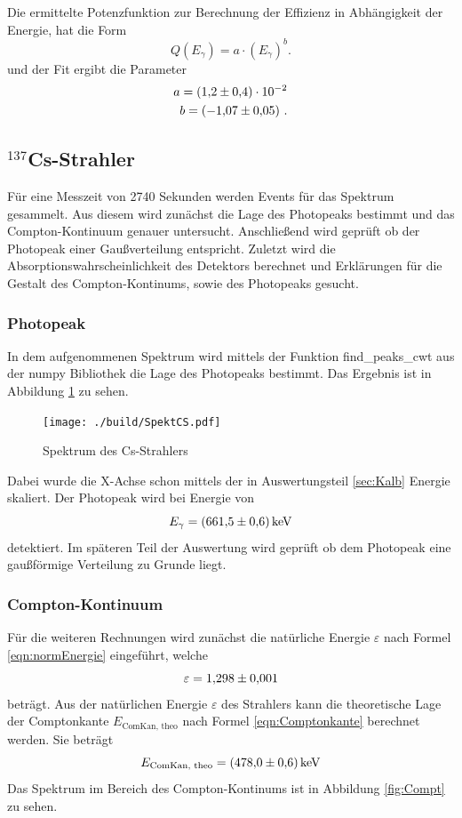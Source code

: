 Die ermittelte Potenzfunktion zur Berechnung der Effizienz in Abhängigkeit der Energie, hat die Form
\begin{equation}
  Q(E_\gamma)=  a \cdot \left( E_\gamma \right)^{b} .
  \label{eqn:QCs}
\end{equation}
und der Fit ergibt die Parameter
\begin{eqnarray}
  a = (\num{1,2 +- 0,4}) \cdot 10^{-2} \\
  b = (\num{-1,07 +- 0,05}) \ .
\end{eqnarray}

\subsection{$^{137}$Cs-Strahler}
Für eine Messzeit von 2740 Sekunden werden Events für das Spektrum gesammelt. Aus diesem wird zunächst die Lage des Photopeaks bestimmt und das Compton-Kontinuum genauer untersucht. Anschließend wird geprüft ob der Photopeak einer Gaußverteilung entspricht. Zuletzt wird die Absorptionswahrscheinlichkeit des Detektors berechnet und Erklärungen für die Gestalt des Compton-Kontinums, sowie des Photopeaks gesucht.


\subsubsection{Photopeak}
In dem aufgenommenen Spektrum wird mittels der Funktion find\_peaks\_cwt aus der numpy Bibliothek die Lage des Photopeaks bestimmt. Das Ergebnis ist in Abbildung \ref{fig:SpekCS} zu sehen.
\begin{figure}
  \centering
  \texttt{[image: ./build/SpektCS.pdf]}
  \caption{Spektrum des Cs-Strahlers}
  \label{fig:SpekCS}
\end{figure}

Dabei wurde die X-Achse schon mittels der in Auswertungsteil \ref{sec:Kalb} Energie skaliert. Der Photopeak wird bei Energie von
\begin{equation}
  E_\gamma = (\num{661,5 +- 0,6}) \, \text{keV}
  \label{eqn:CsPhoto}
\end{equation}
detektiert. Im späteren Teil der Auswertung wird geprüft ob dem Photopeak eine gaußförmige Verteilung zu Grunde liegt.


\subsubsection{Compton-Kontinuum}
Für die weiteren Rechnungen wird zunächst die natürliche Energie $\varepsilon$ nach Formel \ref{eqn:normEnergie} eingeführt, welche
\begin{equation}
\varepsilon = \num{1,298 +- 0,001}
  \label{eqn:nE}
\end{equation}
beträgt. Aus der natürlichen Energie $\varepsilon$ des Strahlers kann die theoretische Lage der Comptonkante $E_\text{ComKan, theo}$ nach Formel \ref{eqn:Comptonkante} berechnet werden. Sie beträgt
\begin{equation}
  E_\text{ComKan, theo} = (\num{478,0 +- 0,6}) \, \text{keV}
  \label{eqn:KanTheo}
\end{equation}
Das Spektrum im Bereich des Compton-Kontinums ist in Abbildung \ref{fig:Compt} zu sehen.

